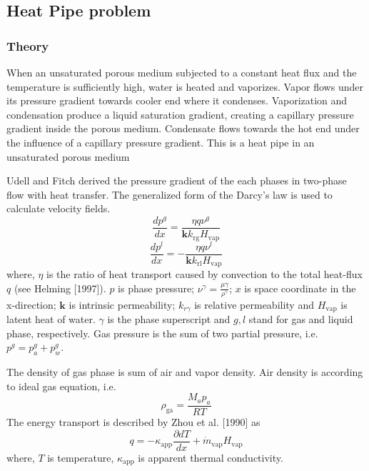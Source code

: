 \subsection{\upshape\textbf{Heat Pipe problem}\label{HPPNonIsoTwoPhaseFlow}}
\subsubsection*{\upshape\textbf{Theory}}
When an unsaturated porous medium subjected to a constant heat flux and the temperature is sufficiently high, water is heated and vaporizes. Vapor flows under its pressure gradient towards cooler end where it condenses. Vaporization and condensation produce a liquid saturation gradient, creating a capillary pressure gradient inside the porous medium. Condensate flows towards the hot end under the influence of a capillary pressure gradient. This is a heat pipe in an unsaturated porous medium


Udell and Fitch derived the pressure gradient of the each phases in two-phase flow with heat transfer. The generalized form of the Darcy's law is used to calculate velocity fields. 
\begin{equation}
\frac{d p^g}{d x} = \frac{\eta q \nu^g}{\mathbf k k_{\mathrm {rg}} H_{\mathrm {vap}}}
\label{eq:HP1}
\end{equation}
\begin{equation}
\frac{d p^l}{d x} =- \frac{\eta q \nu^l}{\mathbf k k_{\mathrm {rl}} H_{\mathrm {vap}}}
\label{eq:HP2}
\end{equation}
where, $\eta$ is the ratio of heat transport caused by convection to the total heat-flux $q$ (see Helming [1997]). $p$ is phase pressure; $\nu^\gamma=\frac{\mu\gamma}{\rho^\gamma}$; $x$ is space coordinate in the x-direction; $\mathbf k$ is intrinsic permeability; $k_{r\gamma}$ is relative permeability and $H_{\mathrm {vap}}$ is latent heat of water. $\gamma$ is the phase superscript and $g, l$ stand for gas and liquid phase, respectively. Gas pressure is the sum of two partial pressure, i.e. $p^g=p^g_a+p^g_w$.

The density of gas phase is sum of air and vapor density. Air density is according to ideal gas equation, i.e.
\begin{equation}
\rho_{\mathrm {ga}}=\frac{M_a p_a}{RT} 
\label{eq:HP3}
\end{equation}
The energy transport is described by Zhou et al. [1990] as
\begin{equation}
q=-\kappa_{\mathrm {app}}\frac{\partial d T}{d x} + \dot m_{\mathrm {vap}} H_{\mathrm {vap}}
\label{eq:HP4}
\end{equation}
where, $T$ is temperature, $\kappa_{\mathrm {app}}$ is apparent thermal conductivity.

